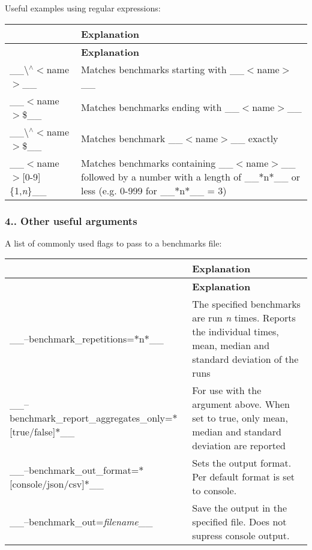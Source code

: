 Useful examples using regular expressions\+:

\tabulinesep=1mm
\begin{longtabu} spread 0pt [c]{*2{|X[-1]}|}
\hline
{}&{\bf Explanation  }\\
\endfirsthead
\hline
\endfoot
\hline
{}&{\bf Explanation  }\\
\endhead
\+\_\+\+\_\+\textbackslash{}$^\wedge$$<$name$>$\+\_\+\+\_\+ &Matches benchmarks starting with \+\_\+\+\_\+$<$name$>$\+\_\+\+\_\+ \\
\+\_\+\+\_\+$<$name$>$\$\+\_\+\+\_\+ &Matches benchmarks ending with \+\_\+\+\_\+$<$name$>$\+\_\+\+\_\+ \\
\+\_\+\+\_\+\textbackslash{}$^\wedge$$<$name$>$\$\+\_\+\+\_\+ &Matches benchmark \+\_\+\+\_\+$<$name$>$\+\_\+\+\_\+ exactly \\
\+\_\+\+\_\+$<$name$>$\mbox{[}0-\/9\mbox{]}\{1,{\itshape n}\}\+\_\+\+\_\+ &Matches benchmarks containing \+\_\+\+\_\+$<$name$>$\+\_\+\+\_\+ followed by a number with a length of \+\_\+\+\_\+$\ast$n$\ast$\+\_\+\+\_\+ or less (e.\+g. 0-\/999 for \+\_\+\+\_\+$\ast$n$\ast$\+\_\+\+\_\+ = 3) \\
\end{longtabu}




\subsubsection*{4.. Other useful arguments}

A list of commonly used flags to pass to a benchmarks file\+:

\tabulinesep=1mm
\begin{longtabu} spread 0pt [c]{*2{|X[-1]}|}
\hline
{}&{\bf Explanation  }\\
\endfirsthead
\hline
\endfoot
\hline
{}&{\bf Explanation  }\\
\endhead
\+\_\+\+\_\+--benchmark\+\_\+repetitions=$\ast$n$\ast$\+\_\+\+\_\+ &The specified benchmarks are run {\itshape n} times. Reports the individual times, mean, median and standard deviation of the runs \\
\+\_\+\+\_\+--benchmark\+\_\+report\+\_\+aggregates\+\_\+only=$\ast$\mbox{[}true/false\mbox{]}$\ast$\+\_\+\+\_\+ &For use with the argument above. When set to true, only mean, median and standard deviation are reported \\
\+\_\+\+\_\+--benchmark\+\_\+out\+\_\+format=$\ast$\mbox{[}console/json/csv\mbox{]}$\ast$\+\_\+\+\_\+ &Sets the output format. Per default format is set to console. \\
\+\_\+\+\_\+--benchmark\+\_\+out={\itshape filename}\+\_\+\+\_\+ &Save the output in the specified file. Does not supress console output. \\
\end{longtabu}




